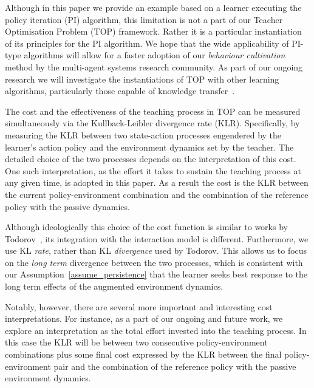 
Although in this paper we provide an example based on a learner
executing the policy iteration (PI) algorithm, this limitation is not
a part of our Teacher Optimisation Problem (TOP) framework. Rather it
is a particular instantiation of its principles for the PI
algorithm. We hope that the wide applicability of PI-type algorithms
will allow for a faster adoption of our {\em behaviour cultivation}
method by the multi-agent systems research community. As part of our
ongoing research we will investigate the instantiations of TOP with
other learning algorithms, particularly those capable of knowledge
transfer~\cite{taylor_stone_2009,taylor_PhD_2008}.

The cost and the effectiveness of the teaching process in TOP can be
measured simultaneously via the Kullback-Leibler divergence rate
(KLR). Specifically, by measuring the KLR between two state-action
processes engendered by the learner's action policy and the
environment dynamics set by the teacher. The detailed choice of the
two processes depends on the interpretation of this cost. One such
interpretation, as the effort it takes to sustain the teaching process
at any given time, is adopted in this paper. As a result the cost is
the KLR between the current policy-environment combination and the
combination of the reference policy with the passive dynamics.

Although ideologically this choice of the cost function is similar to
works by
Todorov~\cite{todorov_2009_framework,todorov_2009_framework_sup}, its
integration with the interaction model is different. Furthermore, we
use KL {\em rate}, rather than KL {\em divergence} used by
Todorov. This allows us to focus on the {\em long term} divergence
between the two processes, which is consistent with our
Assumption~\ref{assume_persistence} that the learner seeks best
response to the long term effects of the augmented environment
dynamics.

Notably, however, there are several more important and interesting
cost interpretations. For instance, as a part of our ongoing and
future work, we explore an interpretation as the total effort invested
into the teaching process. In this case the KLR will be between two
consecutive policy-environment combinations plus some final cost
expressed by the KLR between the final policy-environment pair and the
combination of the reference policy with the passive environment
dynamics.


